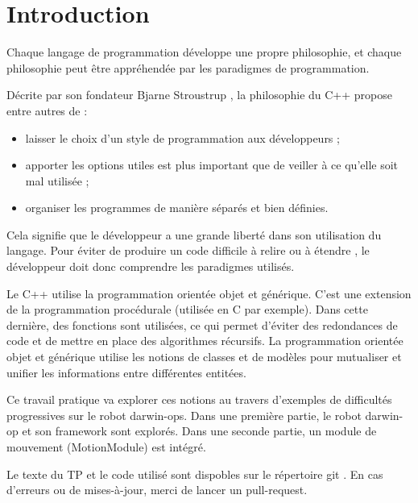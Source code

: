 \documentclass[conference]{IEEEtran}
\begin{document}




\section{Introduction}
\label{sec:intro}


Chaque langage de programmation développe une propre philosophie, et chaque philosophie peut être appréhendée par les paradigmes de programmation.

Décrite par son fondateur Bjarne Stroustrup \cite{stroustrup}, la philosophie du C++ propose entre autres de :
\begin{itemize}
    \item laisser le choix d'un style de programmation aux développeurs ;
    \item apporter les options utiles est plus important que de veiller à ce qu'elle soit mal utilisée ;
    \item organiser les programmes de manière séparés et bien définies.
\end{itemize}
Cela signifie que le développeur a une grande liberté dans son utilisation du langage. Pour éviter de produire un code difficile à relire ou à étendre \cite{stroustrup2}, le développeur doit donc comprendre les paradigmes utilisés.

Le C++ utilise la programmation orientée objet et générique. C'est une extension de la programmation procédurale (utilisée en C par exemple). Dans cette dernière, des fonctions sont utilisées, ce qui permet d'éviter des redondances de code et de mettre en place des algorithmes récursifs.
La programmation orientée objet et générique utilise les notions de classes et de modèles pour mutualiser et unifier les informations entre différentes entitées.


Ce travail pratique va explorer ces notions au travers d'exemples de difficultés progressives sur le robot darwin-ops.
Dans une première partie, le robot darwin-op et son framework sont explorés.
Dans une seconde partie, un module de mouvement (MotionModule) est intégré.

Le texte du TP et le code utilisé sont dispobles sur le répertoire git \cite{git}. En cas d'erreurs ou de mises-à-jour, merci de lancer un pull-request.
\end{document}
